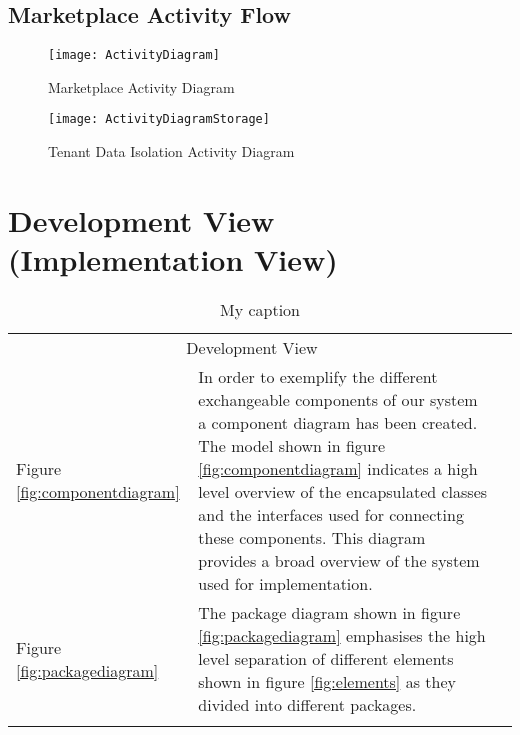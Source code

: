 \subsection{Marketplace Activity Flow}

\begin{figure}
\centering
\texttt{[image: ActivityDiagram]}
\caption{Marketplace Activity Diagram}
\label{fig:activitydiagram}
\end{figure}

\begin{figure}
\centering
\texttt{[image: ActivityDiagramStorage]}
\caption{Tenant Data Isolation Activity Diagram}
\label{fig:activitytenantisolation}
\end{figure}



\section {Development View (Implementation View)}

\begin{table}[h]
\centering
\begin{tabularx}{\textwidth}{lXl}
\cline{1-2}
\multicolumn{2}{|c|}{\cellcolor[HTML]{EFEFEF}Development View} &  \\ \cline{1-2}
\multicolumn{1}{|X|}{Figure \ref{fig:componentdiagram}} & \multicolumn{1}{l|}{In order to exemplify the different exchangeable components of our system a component diagram has been created. The model shown in figure \ref{fig:componentdiagram} indicates a high level overview of the encapsulated classes and the interfaces used for connecting these components. This diagram provides a broad overview of the system used for implementation.} &  \\ \cline{1-2}
\multicolumn{1}{|l|}{Figure \ref{fig:packagediagram}} & \multicolumn{1}{l|}{The package diagram shown in figure \ref{fig:packagediagram} emphasises the high level separation of different elements shown in figure \ref{fig:elements} as they divided into different packages.} &  \\ \cline{1-2}
 &  &  \\ \cline{1-2}
\cline{1-2}
\end{tabularx}
\caption{My caption}
\label{my-label}
\end{table}


